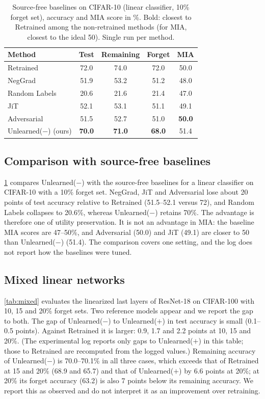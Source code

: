 \documentclass[10pt,twocolumn,letterpaper]{article}
\begin{document}
\begin{table}[t]
  \centering
  \small
  \setlength{\tabcolsep}{4pt}
  \begin{tabular}{@{}lcccc@{}}
    \toprule
    Method & Test & Remaining & Forget & MIA \\
    \midrule
    Retrained & 72.0 & 74.0 & 72.0 & 50.0 \\
    \midrule
    NegGrad & 51.9 & 53.2 & 51.2 & 48.0 \\
    Random Labels & 20.6 & 21.6 & 21.4 & 47.0 \\
    JiT & 52.1 & 53.1 & 51.1 & 49.1 \\
    Adversarial & 51.5 & 52.7 & 51.0 & \textbf{50.0} \\
    Unlearned($-$) (ours) & \textbf{70.0} & \textbf{71.0} & \textbf{68.0} & 51.4 \\
    \bottomrule
  \end{tabular}
  \caption{Source-free baselines on CIFAR-10 (linear classifier, 10\% forget set), accuracy and MIA score in \%. Bold: closest to Retrained among the non-retrained methods (for MIA, closest to the ideal 50). Single run per method.}
  \label{tab:baselines}
\end{table}

\subsection{Comparison with source-free baselines}
\cref{tab:baselines} compares Unlearned($-$) with the source-free baselines for a linear classifier on CIFAR-10 with a 10\% forget set.
NegGrad, JiT and Adversarial lose about 20 points of test accuracy relative to Retrained (51.5--52.1 versus 72), and Random Labels collapses to 20.6\%, whereas Unlearned($-$) retains 70\%.
The advantage is therefore one of utility preservation.
It is not an advantage in MIA: the baseline MIA scores are 47--50\%, and Adversarial (50.0) and JiT (49.1) are closer to 50 than Unlearned($-$) (51.4).
The comparison covers one setting, and the log does not report how the baselines were tuned.



\subsection{Mixed linear networks}
\cref{tab:mixed} evaluates the linearized last layers of ResNet-18 on CIFAR-100 with 10, 15 and 20\% forget sets.
Two reference models appear and we report the gap to both.
The gap of Unlearned($-$) to Unlearned($+$) in test accuracy is small (0.1--0.5 points).
Against Retrained it is larger: 0.9, 1.7 and 2.2 points at 10, 15 and 20\%.
(The experimental log reports only gaps to Unlearned($+$) in this table; those to Retrained are recomputed from the logged values.)
Remaining accuracy of Unlearned($-$) is 70.0--70.1\% in all three cases, which exceeds that of Retrained at 15 and 20\% (68.9 and 65.7) and that of Unlearned($+$) by 6.6 points at 20\%; at 20\% its forget accuracy (63.2) is also 7 points below its remaining accuracy.
We report this as observed and do not interpret it as an improvement over retraining.
\end{document}
